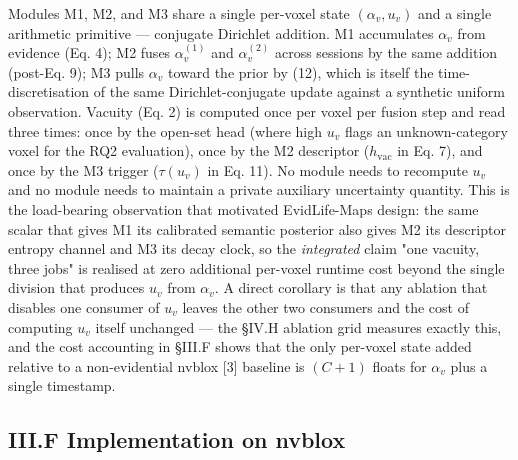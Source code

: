 \documentclass[
]{article}
\begin{document}
Modules M1, M2, and M3 share a single per-voxel state
\((\alpha_v, u_v)\) and a single arithmetic primitive --- conjugate
Dirichlet addition. M1 accumulates \(\alpha_v\) from evidence (Eq. 4);
M2 fuses \(\alpha_v^{(1)}\) and \(\alpha_v^{(2)}\) across sessions by
the same addition (post-Eq. 9); M3 pulls \(\alpha_v\) toward the prior
by (12), which is itself the time-discretisation of the same
Dirichlet-conjugate update against a synthetic uniform observation.
Vacuity (Eq. 2) is computed once per voxel per fusion step and read
three times: once by the open-set head (where high \(u_v\) flags an
unknown-category voxel for the RQ2 evaluation), once by the M2
descriptor (\(h_{\text{vac}}\) in Eq. 7), and once by the M3 trigger
(\(\tau(u_v)\) in Eq. 11). No module needs to recompute \(u_v\) and no
module needs to maintain a private auxiliary uncertainty quantity. This
is the load-bearing observation that motivated
EvidLife-Map\textquotesingle s design: the same scalar that gives M1 its
calibrated semantic posterior also gives M2 its descriptor entropy
channel and M3 its decay clock, so the \emph{integrated} claim "one
vacuity, three jobs" is realised at zero additional per-voxel runtime
cost beyond the single division that produces \(u_v\) from \(\alpha_v\).
A direct corollary is that any ablation that disables one consumer of
\(u_v\) leaves the other two consumers and the cost of computing \(u_v\)
itself unchanged --- the §IV.H ablation grid measures exactly this, and
the cost accounting in §III.F shows that the only per-voxel state added
relative to a non-evidential nvblox {[}3{]} baseline is \((C+1)\) floats
for \(\alpha_v\) plus a single timestamp.

\subsection{III.F Implementation on
nvblox}\label{iiif-implementation-on-nvblox}
\end{document}
